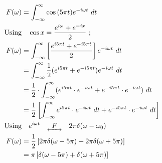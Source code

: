 \documentclass[preview]{standalone}
\begin{document}
\begin{align*}
F(\omega)&=\int_{-\infty}^{\infty} \cos{(5\pi t)} e^{-i\omega t} \ dt \\ \textrm{Using}& \quad \cos{x}=\frac{e^{i\omega}+e^{-ix}}{2} \ ; \\ F(\omega)&=\int_{-\infty}^{\infty}\left[ \frac{e^{i5\pi t}+e^{-i5\pi t}}{2}\right] e^{-i\omega t} \ dt \\ &=\int_{-\infty}^{\infty} \frac{1}{2} (e^{i5\pi t}+e^{-i5\pi t})e^{-i\omega t} \ dt \\ &=\frac{1}{2}\cdot \int_{-\infty}^{\infty}(e^{i5\pi t}\cdot e^{-i\omega t}+e^{-i5\pi t}\cdot e^{-i\omega t}) \ dt \\ &=\frac{1}{2}\left[ \int_{-\infty}^{\infty}e^{i5\pi t}\cdot e^{-i\omega t} \ dt+e^{-i5\pi t}\cdot e^{-i\omega t} \ dt \right] \\ \textrm{Using}& \quad e^{i\omega t} \quad \underleftrightarrow{ \ \ F \ \ } \quad 2\pi \delta(\omega - \omega_{0}) \\ F(\omega)&=\frac{1}{2}\left[ 2\pi \delta(\omega-5\pi)+2\pi\delta(\omega+5\pi) \right] \\ &=\pi\left[\delta(\omega-5\pi)+\delta(\omega+5\pi)\right]
\end{align*}
\end{document}
